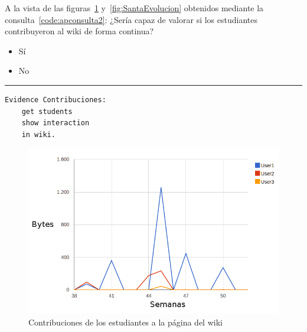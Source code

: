 \begin{mdframed}[style=cuestionarioST]

			A la vista de las figuras~\ref{fig:SantaContribuciones} y~\ref{fig:SantaEvolucion} obtenidos mediante la consulta~\ref{code:apconsulta2}: ¿Sería capaz de valorar si los estudiantes contribuyeron al wiki de forma continua?
			\begin{itemize}
				\item Sí
				\item No
			\end{itemize}

			\rule{30mm}{1pt} \newline

\begin{lstlisting}[caption=Consulta contribuciones de los estudiantes en el wiki,label=code:apconsulta2, captionpos=b, morekeywords={Evidence,get, students, show, milestones, participation, access, in, assignment, forum, campus, wiki, between, and, workshop, interaction, assessment, grade, from, course, backup}]
Evidence Contribuciones: 
	get students 
	show interaction 
	in wiki.
\end{lstlisting}
\end{mdframed}

\begin{figure}[h]
  \begin{center}
    \includegraphics[scale=0.5]{santa_contribuciones.png}
  \end{center}
  \caption{Contribuciones de los estudiantes a la página del wiki}
  \label{fig:SantaContribuciones}
\end{figure}

\newpage

